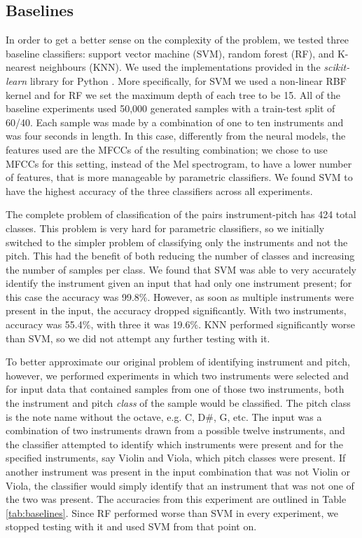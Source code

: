 \documentclass{article}
\begin{document}
\subsection{Baselines}
\label{sec:baseline}

In order to get a better sense on the complexity of the problem, we tested three baseline classifiers: support vector machine (SVM), random forest (RF), and K-nearest neighbours (KNN). We used the implementations provided in the \emph{scikit-learn }library for Python \cite{scikit-learn}. More specifically, for SVM we used a non-linear RBF kernel and for RF we set the maximum depth of each tree to be 15.  All of the baseline experiments used 50,000 generated samples with a train-test split of 60/40. Each sample was made by a combination of one to ten instruments and was four seconds in length. 
In this case, differently from the neural models, the features used are the MFCCs of the resulting combination; we chose to use MFCCs for this setting, instead of the Mel spectrogram, to have a lower number of features, that is more manageable by parametric classifiers. We found SVM to have the highest accuracy of the three classifiers across all experiments.

The complete problem of classification of the pairs instrument-pitch has 424 total classes. This problem is very hard for parametric classifiers, so we initially switched to the simpler problem of classifying only the instruments and not the pitch. This had the benefit of both reducing the number of classes and increasing the number of samples per class. We found that SVM was able to very accurately identify the instrument given an input that had only one instrument present; for this case the accuracy was 99.8\%. However, as soon as multiple instruments were present in the input, the accuracy dropped significantly. With two instruments, accuracy was 55.4\%, with three it was 19.6\%. KNN performed significantly worse than SVM, so we did not attempt any further testing with it.

To better approximate our original problem of identifying instrument and pitch, however, we performed experiments in which two instruments were selected and for input data that contained samples from one of those two instruments, both the instrument and pitch \emph{class} of the sample would be classified. The pitch class is the note name without the octave, e.g. C, D\#, G, etc. The input was a combination of two instruments drawn from a possible twelve instruments, and the classifier attempted to identify which instruments were present and for the specified instruments, say Violin and Viola, which pitch classes were present. If another instrument was present in the input combination that was not Violin or Viola, the classifier would simply identify that an instrument that was not one of the two was present. The accuracies from this experiment are outlined in Table \ref{tab:baselines}. Since RF performed worse than SVM in every experiment, we stopped testing with it and used SVM from that point on.
\end{document}
